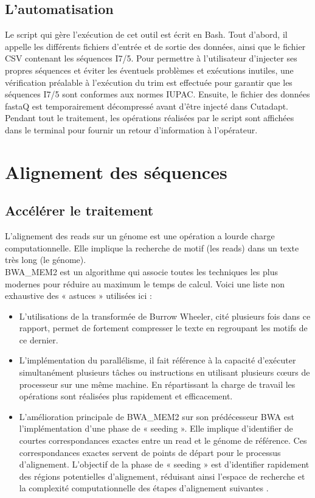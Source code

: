 \subsection*{L'automatisation}
Le script qui gère l'exécution de cet outil est écrit en Bash. Tout d'abord, il appelle les différents fichiers d'entrée et de sortie des données, ainsi que le fichier CSV contenant les séquences I7/5. Pour permettre à l'utilisateur d'injecter ses propres séquences et éviter les éventuels problèmes et exécutions inutiles, une vérification préalable à l'exécution du trim est effectuée pour garantir que les séquences I7/5 sont conformes aux normes IUPAC. Ensuite, le fichier des données fastaQ est temporairement décompressé avant d'être injecté dans Cutadapt. Pendant tout le traitement, les opérations réalisées par le script sont affichées dans le terminal pour fournir un retour d'information à l'opérateur.

\section{Alignement des séquences}

\subsection*{Accélérer le traitement}
L’alignement des reads sur un génome est une opération a lourde charge computationnelle. Elle implique la recherche de motif (les reads) dans un texte très long (le génome). \\

\noindent BWA\_MEM2 est un algorithme qui associe toutes les techniques les plus modernes pour réduire au maximum le temps de calcul. Voici une liste non exhaustive des « astuces » utilisées ici : 

\begin{itemize}
    \item L’utilisations de la transformée de Burrow Wheeler, cité plusieurs fois dans ce rapport, permet de fortement compresser le texte en regroupant les motifs de ce dernier. 
    \item L’implémentation du parallélisme, il fait référence à la capacité d'exécuter simultanément plusieurs tâches ou instructions en utilisant plusieurs cœurs de processeur sur une même machine. En répartissant la charge de travail les opérations sont réalisées plus rapidement et efficacement.
    \item L’amélioration principale de BWA\_MEM2 sur son prédécesseur BWA est l’implémentation d’une phase de « seeding ». Elle implique d'identifier de courtes correspondances exactes entre un read et le génome de référence. Ces correspondances exactes servent de points de départ pour le processus d'alignement. L'objectif de la phase de « seeding » est d'identifier rapidement des régions potentielles d'alignement, réduisant ainsi l'espace de recherche et la complexité computationnelle des étapes d'alignement suivantes \cite{LISA, MEM2Github}.
\end{itemize} \\ 

